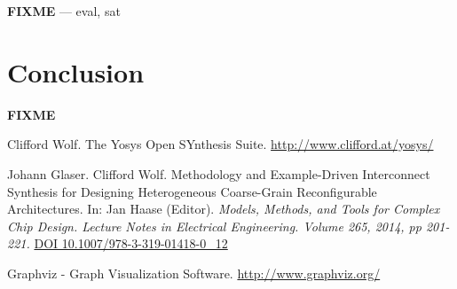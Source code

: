 \documentclass[9pt,technote,a4paper]{IEEEtran}
\def\FIXME{{\color{red}\bf FIXME}}
\begin{document}
\FIXME{} --- eval, sat

\section{Conclusion}
\label{conclusion}

\FIXME

\begin{thebibliography}{9}

Clifford Wolf. The Yosys Open SYnthesis Suite.
\url{http://www.clifford.at/yosys/}

Johann Glaser. Clifford Wolf. Methodology and Example-Driven Interconnect
Synthesis for Designing Heterogeneous Coarse-Grain Reconfigurable
Architectures. In: Jan Haase (Editor). {\it Models, Methods, and Tools for Complex Chip Design.
Lecture Notes in Electrical Engineering. Volume 265, 2014, pp 201-221.\/}
\href{http://dx.doi.org/10.1007/978-3-319-01418-0_12}{DOI 10.1007/978-3-319-01418-0\_12}

Graphviz - Graph Visualization Software.
\url{http://www.graphviz.org/}

\end{thebibliography}
\end{document}
